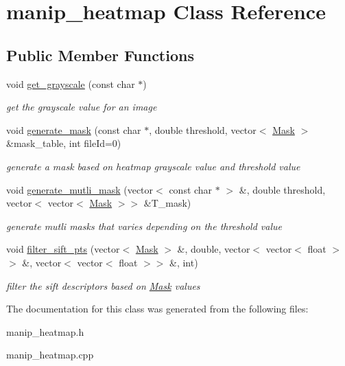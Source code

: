 \hypertarget{classmanip__heatmap}{
\section{manip\_\-heatmap Class Reference}
\label{classmanip__heatmap}
}
\subsection*{Public Member Functions}
\begin{DoxyCompactItemize}
\item 
\hypertarget{classmanip__heatmap_a738445133bf5fa9a2675c0fca612a3be}{
void \hyperlink{classmanip__heatmap_a738445133bf5fa9a2675c0fca612a3be}{get\_\-grayscale} (const char $\ast$)}
\label{classmanip__heatmap_a738445133bf5fa9a2675c0fca612a3be}

\begin{DoxyCompactList}\small\item\em get the grayscale value for an image \end{DoxyCompactList}\item 
\hypertarget{classmanip__heatmap_a5b77e61135b1ad4ad1b26cb3e8e3d98a}{
void \hyperlink{classmanip__heatmap_a5b77e61135b1ad4ad1b26cb3e8e3d98a}{generate\_\-mask} (const char $\ast$, double threshold, vector$<$ \hyperlink{class_mask}{Mask} $>$ \&mask\_\-table, int fileId=0)}
\label{classmanip__heatmap_a5b77e61135b1ad4ad1b26cb3e8e3d98a}

\begin{DoxyCompactList}\small\item\em generate a mask based on heatmap grayscale value and threshold value \end{DoxyCompactList}\item 
\hypertarget{classmanip__heatmap_af519d48e8a3eeaa88db9548d19e6a417}{
void \hyperlink{classmanip__heatmap_af519d48e8a3eeaa88db9548d19e6a417}{generate\_\-mutli\_\-mask} (vector$<$ const char $\ast$ $>$ \&, double threshold, vector$<$ vector$<$ \hyperlink{class_mask}{Mask} $>$$>$ \&T\_\-mask)}
\label{classmanip__heatmap_af519d48e8a3eeaa88db9548d19e6a417}

\begin{DoxyCompactList}\small\item\em generate mutli masks that varies depending on the threshold value \end{DoxyCompactList}\item 
\hypertarget{classmanip__heatmap_a680926706938ec01fe9f0575e1cef619}{
void \hyperlink{classmanip__heatmap_a680926706938ec01fe9f0575e1cef619}{filter\_\-sift\_\-pts} (vector$<$ \hyperlink{class_mask}{Mask} $>$ \&, double, vector$<$ vector$<$ float $>$$>$ \&, vector$<$ vector$<$ float $>$$>$ \&, int)}
\label{classmanip__heatmap_a680926706938ec01fe9f0575e1cef619}

\begin{DoxyCompactList}\small\item\em filter the sift descriptors based on \hyperlink{class_mask}{Mask} values \end{DoxyCompactList}\end{DoxyCompactItemize}


The documentation for this class was generated from the following files:\begin{DoxyCompactItemize}
\item 
manip\_\-heatmap.h\item 
manip\_\-heatmap.cpp\end{DoxyCompactItemize}
